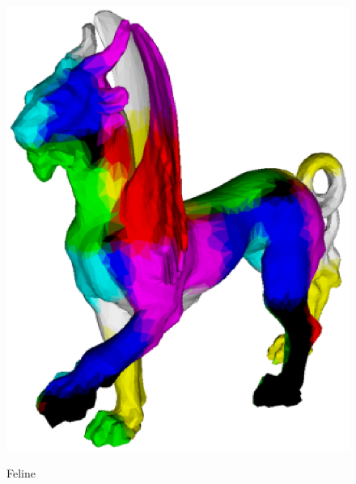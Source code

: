 \documentclass[a4paper,10pt,notitlepage]{scrreprt}
\begin{document}
\begin{figure}
{    \includegraphics[scale=0.4]{feline-checker-l05.eps}}

  \caption{Feline}
\end{figure}
\end{document}
